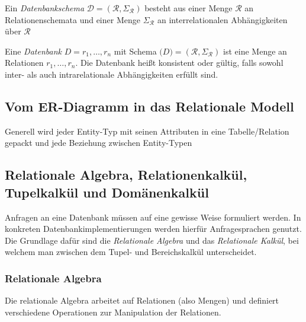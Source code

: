 \documentclass[a4paper,parskip=half*,DIV=15,fontsize=11pt]{scrartcl}
\begin{document}

Ein \textit{Datenbankschema} $\mathcal{D} = (\mathcal{R}, \Sigma_\mathcal{R})$ besteht aus einer Menge $\mathcal{R}$ an Relationenschemata und einer Menge $\Sigma_\mathcal{R}$ an interrelationalen Abhängigkeiten über $\mathcal{R}$

Eine \textit{Datenbank} $D = {r_1, \ldots , r_n}$ mit Schema $\mathcal(D) = (\mathcal{R}, \Sigma_\mathcal{R})$ ist eine Menge an Relationen $r_1, \ldots, r_n$. Die Datenbank heißt konsistent oder gültig, falls sowohl inter- als auch intrarelationale Abhängigkeiten erfüllt sind.

\subsection{Vom ER-Diagramm in das Relationale Modell}
Generell wird jeder Entity-Typ mit seinen Attributen in eine Tabelle/Relation gepackt und jede Beziehung zwischen Entity-Typen

\subsection{Relationale Algebra, Relationenkalkül, Tupelkalkül und Domänenkalkül}
Anfragen an eine Datenbank müssen auf eine gewisse Weise formuliert werden. In konkreten Datenbankimplementierungen werden hierfür Anfragesprachen genutzt. Die Grundlage dafür sind die \textit{Relationale Algebra} und das \textit{Relationale Kalkül}, bei welchem man zwischen dem Tupel- und Bereichskalkül unterscheidet.

\subsubsection{Relationale Algebra}
Die relationale Algebra arbeitet auf Relationen (also Mengen) und definiert verschiedene Operationen zur Manipulation der Relationen.
\end{document}
